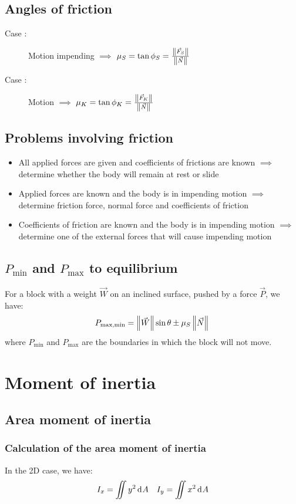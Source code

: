 \documentclass[10pt, twocolumn]{article}
\begin{document}
\subsection{Angles of friction}
\begin{description}
  \item[Case :] Motion impending \(\implies\) \(\mu_S = \tan\phi_S = \frac{\left\| \vec{F}_S \right\|}{\left\| \vec{N} \right\|}\)
  \item[Case :] Motion \(\implies\) \(\mu_K = \tan\phi_K = \frac{\left\| \vec{F}_K \right\|}{\left\| \vec{N} \right\|}\)
\end{description}

\subsection{Problems involving friction}
\begin{itemize}
  \item All applied forces are given and coefficients of frictions are known \(\implies\) determine whether the body will remain at rest or slide
  \item Applied forces are known and the body is in impending motion \(\implies\) determine friction force, normal force and coefficients of friction
  \item Coefficients of friction are known and the body is in impending motion \(\implies\) determine one of the external forces that will cause impending motion
\end{itemize}

\subsection{\(P_\mathrm{min}\) and \(P_\mathrm{max}\) to equilibrium}
For a block with a weight \(\vec{W}\) on an inclined surface, pushed by a force \(\vec{P}\), we have:
\[
  P_\mathrm{max, min} = \left\| \vec{W} \right\| \sin\theta \pm \mu_S \left\| \vec{N} \right\| \\
\]
where \(P_\mathrm{min}\) and \(P_\mathrm{max}\) are the boundaries in which the block will not move.

\section{Moment of inertia}
\subsection{Area moment of inertia}
\subsubsection{Calculation of the area moment of inertia}
In the 2D case, we have:
\begin{align*}
  I_x = \iint{y^2 \,\mathrm{d}^{} A} &  & I_y = \iint{x^2 \,\mathrm{d}^{} A}
\end{align*}
\end{document}
